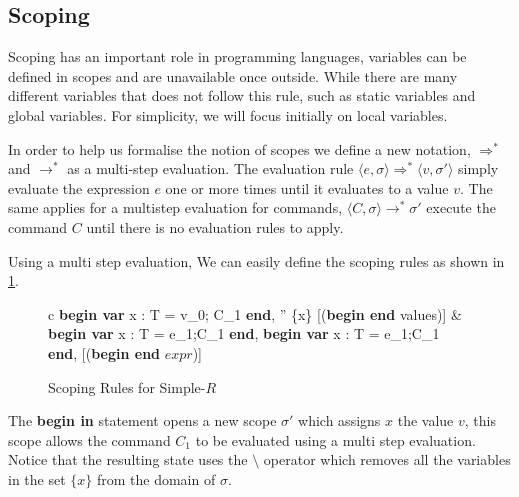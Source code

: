 \documentclass[a4paper,12pt]{report}
\begin{document}
\subsection{Scoping}
Scoping has an important role in programming languages, variables can be defined 
in scopes and are unavailable once outside. While there are many different 
variables that does not follow this rule, such as static variables and global 
variables. For simplicity, we will focus initially on local variables. 

\par
In order to help us formalise the notion of scopes we define a new notation, 
$\Longrightarrow^{*}$ and $\longrightarrow^{*}$ as a multi-step evaluation. 
The evaluation rule $\langle e, \sigma \rangle \Longrightarrow^{*} 
\langle v, \sigma' \rangle$ simply 
evaluate the expression $e$ one or more times until it evaluates to a value $v$. 
The same applies for a multistep evaluation for commands, 
$\langle C, \sigma \rangle \longrightarrow^{*} \sigma'$ execute the command $C$ 
until there is no evaluation rules to apply. 

\par
Using a multi step evaluation, We can easily define the scoping rules as shown 
in \ref{fig:scoping_rules}.
  
\begin{figure}[H]
  \begin{center}
    \begin{tabular}{c}
      {\langle\textbf{begin var }x : T = v_0; C_1 \textbf{ end}, \sigma \rangle 
      \longrightarrow \sigma'' \setminus \{x\}} [(\textbf{begin end} values)] 
      & \\
      \footnotesize
      {\langle \textbf{begin var }x : T = e_1;C_1\textbf{ end}, \sigma \rangle 
      \Longrightarrow \langle\textbf{begin var }x : T = e_1;C_1\textbf{ end}, \sigma \rangle} 
      [(\textbf{begin end} $expr$)]
      \normalsize
    \end{tabular}
  \end{center}
  \caption{Scoping Rules for Simple-$R$}
  \label{fig:scoping_rules}
\end{figure}

\par
The \textbf{begin in} statement opens a new scope $\sigma'$ which 
assigns $x$ the value $v$, this scope allows the command $C_1$ to be evaluated 
using a multi step evaluation. Notice that the resulting state 
uses the $\setminus$ operator which removes all the variables 
in the set $\{x\}$ from the domain of $\sigma$. 
\end{document}
